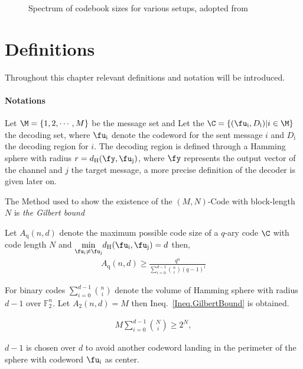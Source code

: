\begin{figure}[H]
    \centering
    
    \caption{Spectrum of codebook sizes for various setups, adopted from \cite{MAMOKO22_Talk}}
    \label{Fig.Coding_Scale}
\end{figure}
\chapter{Definitions}
Throughout this chapter relevant definitions and notation will be introduced.
\subsubsection{Notations}
Let $\M=\{1,2,\cdots,M\}$ be the message set and
Let the $\C = \{(\fu_\text{i},D_\text{i})|i\in\M\}$ the decoding set, where $\fu_\text{i}$ denote the codeword for the sent message $i$ and $D
_\text{i}$ the decoding region for $i$. The decoding region is defined through a Hamming sphere with radius  $r= d_\text{H}(\fy,\fu_\text{j})$, where $\fy$ represents the output vector of the channel and $j$ the target message, a more precise definition of the decoder is given later on.

The Method used to show the existence of the $(M,N)$-Code with block-length $N$ is \emph{the Gilbert bound }
\begin{definition} 
\label{Th.Gilbert_Bound}
Let $A_{\text{q}}(n,d)$ denote the maximum possible code size of a $q$-ary code $\C$ with code length $N$ and $\underset{\fu_{\text{i}}\neq\fu_{\text{j}}}{\min} d_{\text{H}}(\fu_{\text{i}},\fu_{\text{j}}) = d $ then,
\begin{align}
    A_{\text{q}}(n,d) \geq \frac{q^n}{\sum_{i=0}^{d-1} \binom{n}{i} (q-1)^{i}}
\end{align}
\end{definition}
\begin{remark}
For binary codes $ \sum_{i=0}^{d-1} \binom{n}{i}$ denote the volume of Hamming sphere with radius $d-1$ over $\mathbb{F}_2^n$. Let  $A_2(n,d)=M$ then Ineq.~\ref{Ineq.GilbertBound} is obtained.

\begin{align}
\label{Eq.GB2}
    M \sum_{i=0}^{d-1} \binom{N}{i} \geq 2^N,
\end{align}
\end{remark}
\begin{remark}
 $d-1$ is chosen over $d$ to avoid another codeword  landing in the perimeter of the sphere with codeword $\fu_{\text{i}}$ as center.
\end{remark}

